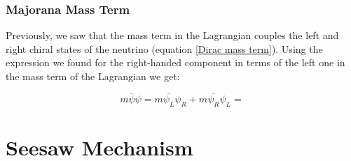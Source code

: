 \subsubsection{Majorana Mass Term}

Previously, we saw that the mass term in the Lagrangian couples the left and right chiral states of the neutrino (equation \ref{Dirac mass term}). 
Using the expression we found for the right-handed component in terms of the left one in the mass term of the Lagrangian we get:

\begin{equation}
m \overline{\psi}\psi = m \overline{\psi_L} \psi_R + m \overline{\psi_R}\psi_L = 
\end{equation}




\section{Seesaw Mechanism}









